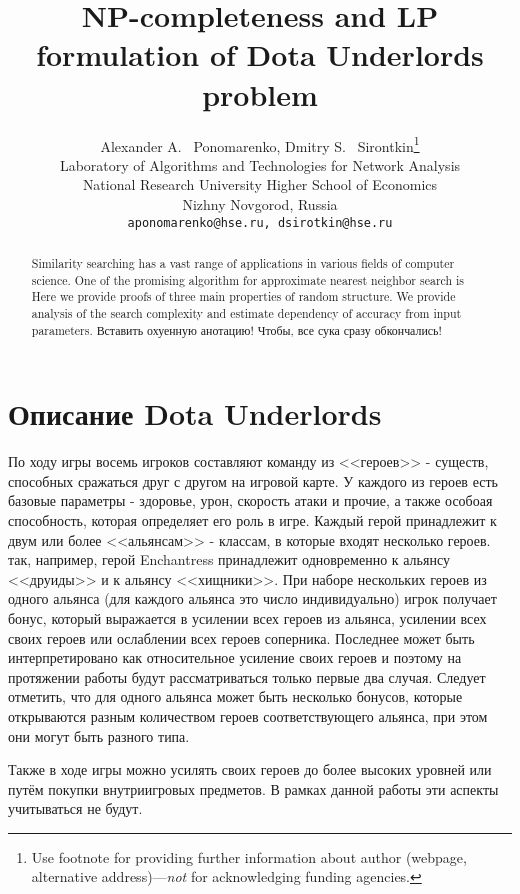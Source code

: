 \documentclass{article}
\title{NP-completeness and LP formulation of Dota Underlords problem}
\author{
  Alexander A. ~Ponomarenko, Dmitry S. ~Sirontkin\thanks{Use footnote for providing further
    information about author (webpage, alternative
    address)---\emph{not} for acknowledging funding agencies.} \\
  Laboratory of Algorithms and Technologies for Network Analysis\\
  National Research University Higher School of Economics \\
  Nizhny Novgorod, Russia\\
  \texttt{aponomarenko@hse.ru, dsirotkin@hse.ru} \\
}
\begin{document}
\maketitle

\begin{abstract}
Similarity searching has a vast range of applications in various fields of computer science. One of the promising algorithm for approximate nearest neighbor search is
Here we provide proofs of three main properties of random structure.
We provide analysis of the search complexity and estimate dependency of accuracy from input parameters. 
Вставить охуенную анотацию! Чтобы, все сука сразу обкончались!
\end{abstract}




\section{Описание Dota Underlords}

По ходу игры восемь игроков составляют команду из <<героев>> - существ, способных сражаться друг с другом на игровой карте. У каждого из героев есть базовые параметры - здоровье, урон, скорость атаки и прочие, а также особоая способность, которая определяет его роль в игре. Каждый герой принадлежит к двум или более <<альянсам>> - классам, в которые входят несколько героев. так, например, герой Enchantress принадлежит одновременно к альянсу <<друиды>> и к альянсу <<хищники>>. При наборе нескольких героев из одного альянса (для каждого альянса это число индивидуально) игрок получает бонус, который выражается в усилении всех героев из альянса, усилении всех своих героев или ослаблении всех героев соперника. Последнее может быть интерпретировано как относительное усиление своих героев и поэтому на протяжении работы будут рассматриваться только первые два случая. Следует отметить, что для одного альянса может быть несколько бонусов, которые открываются разным количеством героев соответствующего альянса, при этом они могут быть разного типа.

Также в ходе игры можно усилять своих героев до более высоких уровней или путём покупки внутриигровых предметов. В рамках данной работы эти аспекты учитываться не будут.
\end{document}
